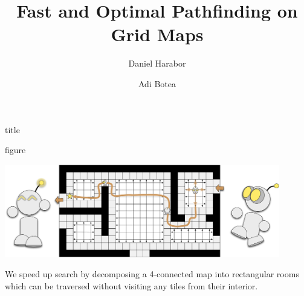 \documentclass[a0,landscape]{a0poster}
\title{Fast and Optimal Pathfinding on Grid Maps}
\date{}%
\author{Daniel Harabor \and Adi Botea}
\begin{document}
\begin{staticcontents*}{title}
\maketitle
\end{staticcontents*}
\thispagestyle{empty} 


\begin{staticcontents*}{figure}
\begin{staticfigure}
\label{fig:splash}
\begin{center}
\vspace{2em}
\includegraphics[width=0.9\textwidth, trim = 30mm 0mm 30mm 0mm]{diagrams/robot_splash2}
\caption{We speed up search by decomposing a 4-connected map into rectangular
rooms which can be traversed without visiting any tiles from their interior.} 
\end{center}
\end{staticfigure}
\end{staticcontents*}
\end{document}
